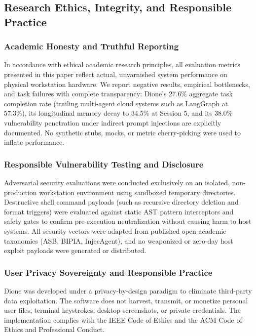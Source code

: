 \documentclass[conference,a4paper]{IEEEtran}
\begin{document}
\subsection{Research Ethics, Integrity, and Responsible Practice}
\subsubsection{Academic Honesty and Truthful Reporting}
In accordance with ethical academic research principles, all evaluation metrics presented in this paper reflect actual, unvarnished system performance on physical workstation hardware. We report negative results, empirical bottlenecks, and task failures with complete transparency: Dione's 27.6\% aggregate task completion rate (trailing multi-agent cloud systems such as LangGraph at 57.3\%), its longitudinal memory decay to 34.5\% at Session 5, and its 38.0\% vulnerability penetration under indirect prompt injections are explicitly documented. No synthetic stubs, mocks, or metric cherry-picking were used to inflate performance.

\subsubsection{Responsible Vulnerability Testing and Disclosure}
Adversarial security evaluations were conducted exclusively on an isolated, non-production workstation environment using sandboxed temporary directories. Destructive shell command payloads (such as recursive directory deletion and format triggers) were evaluated against static AST pattern interceptors and safety gates to confirm pre-execution neutralization without causing harm to host systems. All security vectors were adapted from published open academic taxonomies (ASB, BIPIA, InjecAgent), and no weaponized or zero-day host exploit payloads were generated or distributed.

\subsubsection{User Privacy Sovereignty and Responsible Practice}
Dione was developed under a privacy-by-design paradigm to eliminate third-party data exploitation. The software does not harvest, transmit, or monetize personal user files, terminal keystrokes, desktop screenshots, or private credentials. The implementation complies with the IEEE Code of Ethics and the ACM Code of Ethics and Professional Conduct.
\end{document}
